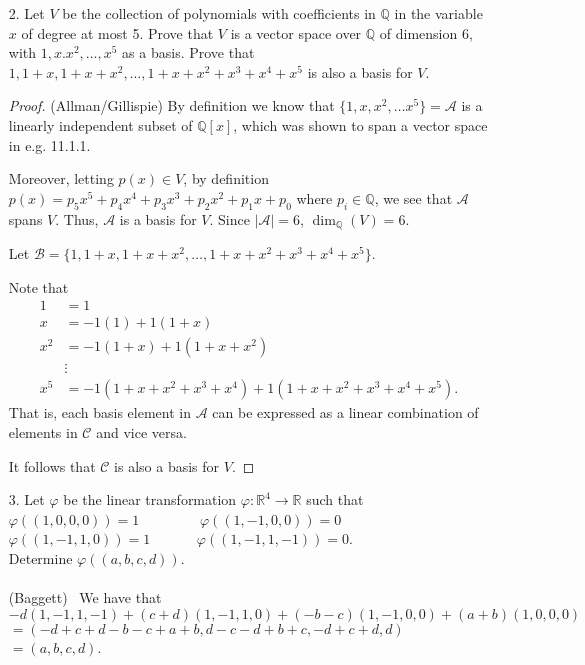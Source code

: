 \documentclass[10pt]{article}
\newcommand{\R}{\mathbb{R}}
\newcommand{\Q}{\mathbb{Q}}
\begin{document}
\begin{itemize}
\begin{proof}
More concretely, to show $\dim_\R(W^\perp) = n-1$ for ${\bf a} \neq
{\bf 0}$, we can without loss of generality assume that the last coordinate
$a_n$ of ${\bf a}$ is non-zero, $a_n \neq 0$.  Then for any choice of 
real numbers, $x_1, \cdots, x_{n-1}$, let $x_n =
\frac{-1}{a_n} (a_1 x_1 + \cdots + a_{n-1} x_{n-1})$ and $x = (x_1,
\dots, x_n)$.  It is easy to check that ${\bf a} \cdot x = 0$ and so $x \in W^\perp$.
Finally, since there were $n-1$ free choices $(x_1, \dots, x_{n-1})$, this means
that $\dim_\R(W^\perp) = n-1$.
\end{proof}


\item[2.] Let $V$ be the collection of polynomials
with coefficients in $\Q$ in the variable $x$ of degree at most
5. Prove that $V$ is a vector space over $\Q$ of dimension 6, with
$1,x.x^{2},\dots,x^{5}$ as a basis. Prove that $1,1+x,1+x+x^{2},\dots,1+x+x^{2}+x^{3}+x^{4}+x^{5}$
is also a basis for $V$.

\begin{proof} (Allman/Gillispie)
 By definition we know that $\{1,x,x^{2},\dots x^{5}\}=\mathcal{A}$
is a linearly independent subset of $\Q[x]$, which was shown to span
a vector space in e.g. 11.1.1.

Moreover, 
letting $p(x)\in V$, by definition $p(x)=p_{5}x^{5}+p_{4}x^{4}+p_{3}x^{3}+p_{2}x^{2}+p_{1}x+p_{0}$
where $p_{i}\in\Q$, we see that $\mathcal{A}$ spans $V$.  Thus, $\mathcal{A}$
is a basis for $V$.  Since $\vert \mathcal{A} \vert = 6$, $\dim_\Q(V) = 6$.

Let $\mathcal{B}=\{1,1+x,1+x+x^{2},\dots,1+x+x^{2}+x^{3}+x^{4}+x^{5}\}$.

Note that
\begin{align*}
1 &= 1\\
x &= -1(1) + 1(1+x)\\
x^2 &= -1(1+x) + 1(1+x+x^2)\\
&\vdots\\
x^5 &=-1(1+x+x^2+x^3+x^4) + 1(1+x+x^2+x^3+x^4+x^5).
\end{align*}
That is, each basis element in $\mathcal{A}$ can be expressed as
a linear combination of elements in $\mathcal{C}$ and vice versa.

It follows that $\mathcal{C}$ is also a basis for $V$.
\end{proof}



\item[3.] Let $\varphi$ be the linear transformation $\varphi:\R^4\rightarrow\R$ such that
\\ $\varphi((1,0,0,0)) = 1$ \ \ \ \ \ \ \ \ $\varphi((1,-1,0,0)) = 0$
\\ $\varphi((1,-1,1,0)) = 1$ \ \ \ \ \ \ $\varphi((1,-1,1,-1)) = 0$.
\\ Determine $\varphi((a,b,c,d))$.
\\
\\ (Baggett) \ We have that
\\ $-d(1,-1,1,-1) + (c+d)(1,-1,1,0) + (-b-c)(1,-1,0,0) + (a+b)(1,0,0,0)$\\
 $= (-d+c+d-b-c+a+b, d-c-d+b+c, -d+c+d, d)$\\
 $= (a, b, c, d)$.



\end{itemize}
\end{document}
